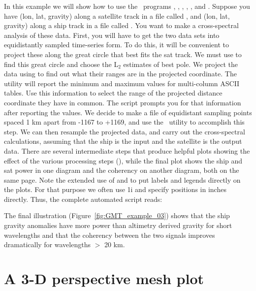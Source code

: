 In this example we will show how to use the \GMT\ programs
, , ,
, , and .
Suppose you have (lon, lat, gravity) along a satellite track
in a file called , and (lon, lat, gravity)
along a ship track in a file called .
You want to make a cross-spectral analysis of these data.
First, you will have to get the two data sets into equidistantly
sampled time-series form.  To do this, it will be convenient to
project these along the great circle that best fits the sat track.
We must use  to find this great circle and choose
the L$_2$  estimates of best pole.  We project the data using
 to find out what their ranges are in the projected
coordinate.  The  utility will report the minimum and
maximum values for multi-column ASCII tables.  Use this information
to select the range of the projected distance coordinate they have
in common.  The script prompts you for that information after
reporting the values.  We decide to make a file of equidistant
sampling points spaced 1 km apart from -1167 to +1169, and use
the \UNIX\ utility  to accomplish this step.  We can then
resample the projected data, and carry out the cross-spectral
calculations, assuming that the ship is the input and the satellite
is the output data.  There are several intermediate steps that
produce helpful plots showing the effect of the various processing
steps (), while the final plot
 shows
the ship and sat power in one diagram and the coherency on another
diagram, both on the same page.  Note the extended use of
 and  to put labels and legends directly on
the plots.  For that purpose we often use 1i and specify
positions in inches directly.  Thus, the complete automated
script reads:


The final illustration (Figure~\ref{fig:GMT_example_03}) shows that the ship gravity
anomalies have more power than altimetry derived gravity for
short wavelengths and that the coherency between the two
signals improves dramatically for wavelengths $>$ 20 km.


\section{A 3-D perspective mesh plot}

